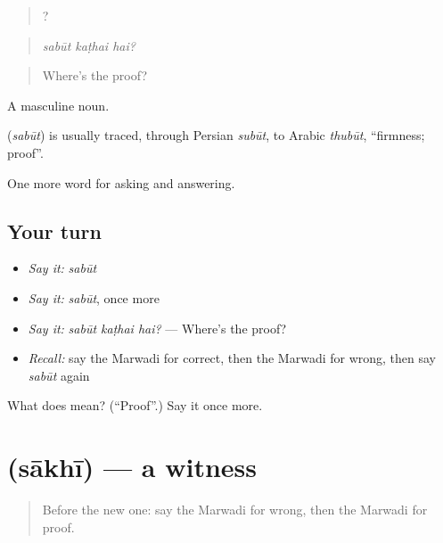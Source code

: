 \begin{quote}
  ?
\end{quote}

\begin{quote}
\emph{sabūt kaṭhai hai?}
\end{quote}

\begin{quote}
Where's the proof?
\end{quote}

A masculine noun.

\begin{cousinweb}
\textbf{} (\emph{sabūt}) is usually traced, through Persian \emph{subūt}, to Arabic \emph{thubūt}, \textquotedblleft{}firmness; proof\textquotedblright{}.
\end{cousinweb}

\begin{grammarlens}[title={What you've built}]
One more word for asking and answering.
\end{grammarlens}

\subsection*{Your turn}
\begin{itemize}
\raggedright
  \item \emph{Say it:} \emph{sabūt}
  \item \emph{Say it:} \emph{sabūt}, once more
  \item \emph{Say it:} \emph{sabūt kaṭhai hai?} — Where's the proof?
  \item \emph{Recall:} say the Marwadi for correct, then the Marwadi for wrong, then say \emph{sabūt} again
\end{itemize}

\begin{tcolorbox}[breakable,colback=teal!4,colframe=teal!35!black,title={Before you move on}]
What does  mean? (\textquotedblleft{}Proof\textquotedblright{}.) Say it once more.
\end{tcolorbox}
\section[\texorpdfstring{\mw{साखी} (sākhī)}{साखी (sākhī)}]{ (sākhī) — a witness}

\label{lesson:MW-C271-sakhi}



\begin{quote}
Before the new one: say the Marwadi for wrong, then the Marwadi for proof.
\end{quote}

